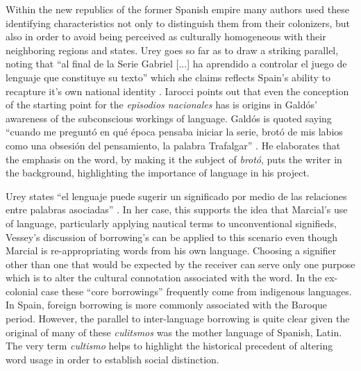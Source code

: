 \documentclass[12pt]{report}
\begin{document}
Within the new republics of the former Spanish empire many authors used these identifying characteristics not only to distinguish them from their colonizers, but also in order to avoid being perceived as culturally homogeneous with their neighboring regions and states.
Urey goes so far as to draw a striking parallel, noting that \enquote{al final de la Serie Gabriel [...] ha aprendido a controlar el juego de lenguaje que constituye su texto} which she claims reflects Spain's ability to recapture it's own national identity \cite[1532]{Urey}.
Iarocci points out that even the conception of the starting point for the \textit{episodios nacionales} has is origins in Galdós' awareness of the subconscious workings of language.
Galdós is quoted saying \enquote{cuando me preguntó en qué época pensaba iniciar la serie, brotó de mis labios como una obsesión del pensamiento, la palabra Trafalgar} \cite[184]{Iarocci2003}.
He elaborates that the emphasis on the word, by making it the subject of \textit{brotó}, puts the writer in the background, highlighting the importance of language in his project.


Urey states \enquote{el lenguaje puede sugerir un significado por medio de las relaciones entre palabras asociadas} \cite[1529]{Urey}.
In her case, this supports the idea that Marcial's use of language, particularly applying nautical terms to unconventional signifieds, 
Vessey's discussion of borrowing's can be applied to this scenario even though Marcial is re-appropriating words from his own language.
Choosing a signifier other than one that would be expected by the receiver can serve only one purpose which is to alter the cultural connotation associated with the word.
In the ex-colonial case these \enquote{core borrowings} frequently come from indigenous languages.
In Spain, foreign borrowing is more commonly associated with the Baroque period.
However, the parallel to inter-language borrowing is quite clear given the original of many of these \textit{culitsmos} was the mother language of Spanish, Latin.
The very term \textit{cultismo} helps to highlight the historical precedent of altering word usage in order to establish social distinction.
\end{document}
